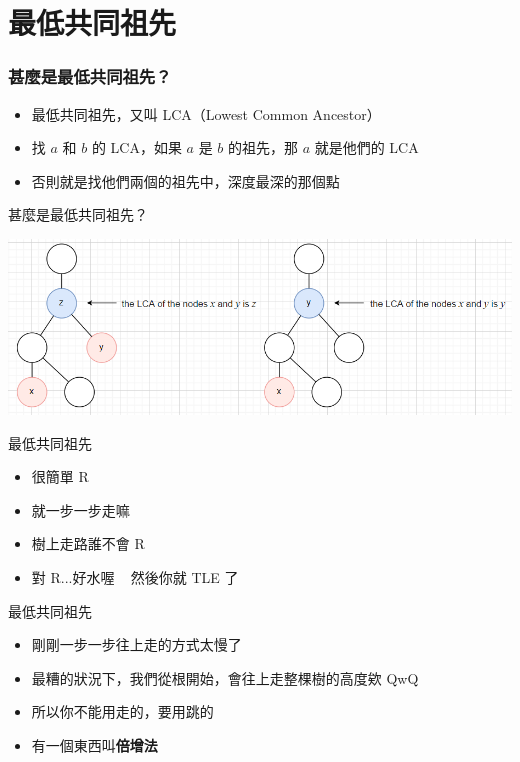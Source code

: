 \documentclass[aspectratio=169]{beamer}
\begin{document}
    \section{最低共同祖先}
    \begin{frame}
        \frametitle{甚麼是最低共同祖先？}
        
        \begin{itemize}
            \item 最低共同祖先，又叫 LCA（Lowest Common Ancestor）
            \item 找 $a$ 和 $b$ 的 LCA，如果 $a$ 是 $b$ 的祖先，那 $a$ 就是他們的 LCA
            \item 否則就是找他們兩個的祖先中，深度最深的那個點
        \end{itemize}
    \end{frame}
    \begin{frame}{甚麼是最低共同祖先？}
        \begin{center}
            \includegraphics[scale=0.7]{images/what_is_LCA.png}
        \end{center}
    \end{frame}
    \begin{frame}{最低共同祖先}
        \begin{itemize}
            \item 很簡單 R
            \item 就一步一步走嘛
            \item 樹上走路誰不會 R
            \item<2-> 對 R...好水喔 ~ 然後你就 TLE 了
        \end{itemize}
    \end{frame}
    
    \begin{frame}{最低共同祖先}
        \begin{itemize}
            \item 剛剛一步一步往上走的方式太慢了
            \item 最糟的狀況下，我們從根開始，會往上走整棵樹的高度欸 QwQ
            \item<2-> 所以你不能用走的，要用跳的
            \item<2-> 有一個東西叫\textbf{倍增法}
        \end{itemize}
    \end{frame}
    
\end{document}
